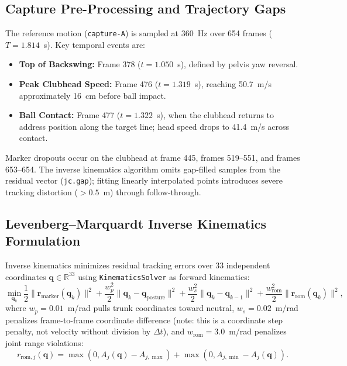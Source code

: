 \documentclass[11pt,a4paper]{article}
\begin{document}
\subsection{Capture Pre-Processing and Trajectory Gaps}
The reference motion (\texttt{capture-A}) is sampled at 360~Hz over 654 frames ($T = 1.814$~s). Key temporal events are:
\begin{itemize}
    \item \textbf{Top of Backswing:} Frame 378 ($t = 1.050$~s), defined by pelvis yaw reversal.
    \item \textbf{Peak Clubhead Speed:} Frame 476 ($t = 1.319$~s), reaching 50.7~m/s approximately 16~cm before ball impact.
    \item \textbf{Ball Contact:} Frame 477 ($t = 1.322$~s), when the clubhead returns to address position along the target line; head speed drops to 41.4~m/s across contact.
\end{itemize}
Marker dropouts occur on the clubhead at frame 445, frames 519--551, and frames 653--654. The inverse kinematics algorithm omits gap-filled samples from the residual vector (\texttt{jc.gap}); fitting linearly interpolated points introduces severe tracking distortion ($> 0.5$~m) through follow-through.

\subsection{Levenberg--Marquardt Inverse Kinematics Formulation}
Inverse kinematics minimizes residual tracking errors over 33 independent coordinates $\mathbf{q} \in \mathbb{R}^{33}$ using \texttt{KinematicsSolver} as forward kinematics:
\begin{equation}
    \min_{\mathbf{q}_k} \frac{1}{2} \|\mathbf{r}_{\text{marker}}(\mathbf{q}_k)\|^2 + \frac{w_p^2}{2} \|\mathbf{q}_k - \mathbf{q}_{\text{posture}}\|^2 + \frac{w_s^2}{2} \|\mathbf{q}_k - \mathbf{q}_{k-1}\|^2 + \frac{w_{\text{rom}}^2}{2} \|\mathbf{r}_{\text{rom}}(\mathbf{q}_k)\|^2,
\end{equation}
where $w_p = 0.01$~m/rad pulls trunk coordinates toward neutral, $w_s = 0.02$~m/rad penalizes frame-to-frame coordinate difference (note: this is a coordinate step penalty, not velocity without division by $\Delta t$), and $w_{\text{rom}} = 3.0$~m/rad penalizes joint range violations:
\begin{equation}
    r_{\text{rom}, j}(\mathbf{q}) = \max\left(0, A_j(\mathbf{q}) - A_{j,\max}\right) + \max\left(0, A_{j,\min} - A_j(\mathbf{q})\right).
\end{equation}
\end{document}
